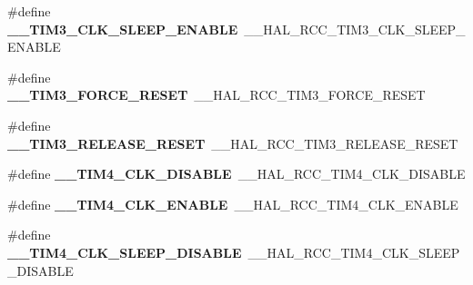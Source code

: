 \begin{DoxyCompactItemize}
\item 
\mbox{\label{group___h_a_l___r_c_c___aliased_gae893042ae5e7b7f5df7dddacb5b3698e}} 
\#define {\bfseries \+\_\+\+\_\+\+T\+I\+M3\+\_\+\+C\+L\+K\+\_\+\+S\+L\+E\+E\+P\+\_\+\+E\+N\+A\+B\+LE}~\+\_\+\+\_\+\+H\+A\+L\+\_\+\+R\+C\+C\+\_\+\+T\+I\+M3\+\_\+\+C\+L\+K\+\_\+\+S\+L\+E\+E\+P\+\_\+\+E\+N\+A\+B\+LE
\item 
\mbox{\label{group___h_a_l___r_c_c___aliased_ga97d9c3f9b7a082c72411747907d3adde}} 
\#define {\bfseries \+\_\+\+\_\+\+T\+I\+M3\+\_\+\+F\+O\+R\+C\+E\+\_\+\+R\+E\+S\+ET}~\+\_\+\+\_\+\+H\+A\+L\+\_\+\+R\+C\+C\+\_\+\+T\+I\+M3\+\_\+\+F\+O\+R\+C\+E\+\_\+\+R\+E\+S\+ET
\item 
\mbox{\label{group___h_a_l___r_c_c___aliased_ga8b8192c731e744d5018630a86deb118b}} 
\#define {\bfseries \+\_\+\+\_\+\+T\+I\+M3\+\_\+\+R\+E\+L\+E\+A\+S\+E\+\_\+\+R\+E\+S\+ET}~\+\_\+\+\_\+\+H\+A\+L\+\_\+\+R\+C\+C\+\_\+\+T\+I\+M3\+\_\+\+R\+E\+L\+E\+A\+S\+E\+\_\+\+R\+E\+S\+ET
\item 
\mbox{\label{group___h_a_l___r_c_c___aliased_ga489be82d36ad4def594b8ae60320f3c6}} 
\#define {\bfseries \+\_\+\+\_\+\+T\+I\+M4\+\_\+\+C\+L\+K\+\_\+\+D\+I\+S\+A\+B\+LE}~\+\_\+\+\_\+\+H\+A\+L\+\_\+\+R\+C\+C\+\_\+\+T\+I\+M4\+\_\+\+C\+L\+K\+\_\+\+D\+I\+S\+A\+B\+LE
\item 
\mbox{\label{group___h_a_l___r_c_c___aliased_gaa07342539b69e7fc53a934d91f6915e2}} 
\#define {\bfseries \+\_\+\+\_\+\+T\+I\+M4\+\_\+\+C\+L\+K\+\_\+\+E\+N\+A\+B\+LE}~\+\_\+\+\_\+\+H\+A\+L\+\_\+\+R\+C\+C\+\_\+\+T\+I\+M4\+\_\+\+C\+L\+K\+\_\+\+E\+N\+A\+B\+LE
\item 
\mbox{\label{group___h_a_l___r_c_c___aliased_gac785e48843cc0930737a7865794d502e}} 
\#define {\bfseries \+\_\+\+\_\+\+T\+I\+M4\+\_\+\+C\+L\+K\+\_\+\+S\+L\+E\+E\+P\+\_\+\+D\+I\+S\+A\+B\+LE}~\+\_\+\+\_\+\+H\+A\+L\+\_\+\+R\+C\+C\+\_\+\+T\+I\+M4\+\_\+\+C\+L\+K\+\_\+\+S\+L\+E\+E\+P\+\_\+\+D\+I\+S\+A\+B\+LE
\item 
\mbox{\label{group___h_a_l___r_c_c___aliased_ga4800dcd32761c733ad412cb7480f7f5a}} 

\end{DoxyCompactItemize}
